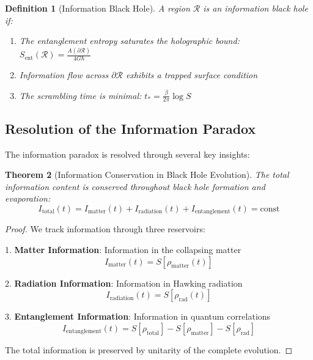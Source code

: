 \documentclass[12pt,a4paper]{article}
\newtheorem{theorem}{Theorem}[section]
\newtheorem{definition}[theorem]{Definition}
\begin{document}
\begin{definition}[Information Black Hole]
A region $\mathcal{R}$ is an information black hole if:
\begin{enumerate}
\item The entanglement entropy saturates the holographic bound: $S_{\text{ent}}(\mathcal{R}) = \frac{A(\partial\mathcal{R})}{4G\hbar}$
\item Information flow across $\partial\mathcal{R}$ exhibits a trapped surface condition
\item The scrambling time is minimal: $t_* = \frac{\beta}{2\pi} \log S$
\end{enumerate}
\end{definition}

\subsection{Resolution of the Information Paradox}

The information paradox is resolved through several key insights:

\begin{theorem}[Information Conservation in Black Hole Evolution]
The total information content is conserved throughout black hole formation and evaporation:
\begin{equation}
I_{\text{total}}(t) = I_{\text{matter}}(t) + I_{\text{radiation}}(t) + I_{\text{entanglement}}(t) = \text{const}
\end{equation}
\end{theorem}

\begin{proof}
We track information through three reservoirs:

1. \textbf{Matter Information}: Information in the collapsing matter
\begin{equation}
I_{\text{matter}}(t) = S[\rho_{\text{matter}}(t)]
\end{equation}

2. \textbf{Radiation Information}: Information in Hawking radiation
\begin{equation}
I_{\text{radiation}}(t) = S[\rho_{\text{rad}}(t)]
\end{equation}

3. \textbf{Entanglement Information}: Information in quantum correlations
\begin{equation}
I_{\text{entanglement}}(t) = S[\rho_{\text{total}}] - S[\rho_{\text{matter}}] - S[\rho_{\text{rad}}]
\end{equation}

The total information is preserved by unitarity of the complete evolution.
\end{proof}
\end{document}
